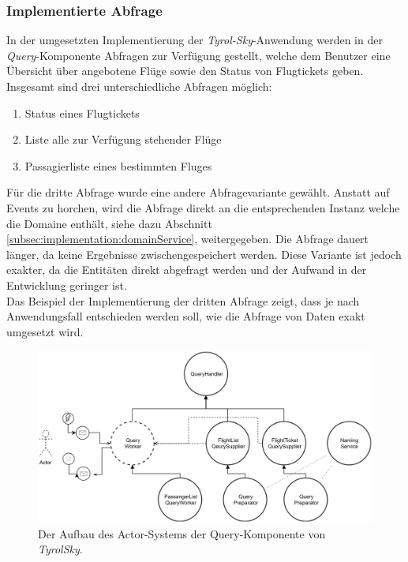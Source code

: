 \subsubsection{Implementierte Abfrage}
In der umgesetzten Implementierung der \textit{Tyrol-Sky}-Anwendung werden in der \textit{Query}-Komponente Abfragen zur Verfügung gestellt, welche dem Benutzer eine Übersicht über angebotene Flüge sowie den Status von Flugtickets geben. Insgesamt sind drei unterschiedliche Abfragen möglich:

\begin{enumerate}
  \item Status eines Flugtickets 
  \item Liste alle zur Verfügung stehender Flüge
  \item Passagierliste eines bestimmten Fluges
\end{enumerate}

Für die dritte Abfrage wurde eine andere Abfragevariante gewählt. Anstatt auf Events zu horchen, wird die Abfrage direkt an die entsprechenden Instanz welche die Domaine enthält, siehe dazu Abschnitt \ref{subsec:implementation:domainService}, weitergegeben. Die Abfrage dauert länger, da keine Ergebnisse zwischengespeichert werden. Diese Variante ist jedoch exakter, da die Entitäten direkt abgefragt werden und der Aufwand in der Entwicklung geringer ist. \\
Das Beispiel der Implementierung der dritten Abfrage zeigt, dass je nach Anwendungsfall entschieden werden soll, wie die Abfrage von Daten exakt umgesetzt wird.
\begin{figure}
  \centering
  \includegraphics[width=\linewidth]{gfx/implementation/QueringServiceActorModel}
  \caption{Der Aufbau des Actor-Systems der Query-Komponente von \textit{TyrolSky}.}
  \label{fig:implementation:queryActorModel}
\end{figure} 

